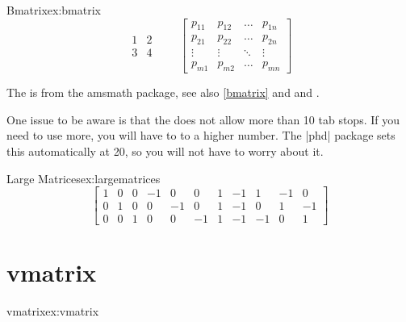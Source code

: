 {{{\begin{texexample}{Bmatrix}{ex:bmatrix}
\begin{equation}
\begin{matrix}
1 & 2 \\
3 & 4
\end{matrix} \qquad
\begin{bmatrix}
p_{11} & p_{12} & \ldots & p_{1n} \\
p_{21} & p_{22} & \ldots & p_{2n} \\
\vdots & \vdots & \ddots & \vdots \\
p_{m1} & p_{m2} & \ldots & p_{mn}
\end{bmatrix}
\end{equation}
\end{texexample}

The  is from the amsmath package, see also \vref{bmatrix} and  and \pageref{bmatrix}. 


One issue to be aware is that the  does not allow more than 10 tab stops. If you need to use more, you will have to  to a higher number. The |phd| package sets this automatically at 20, so you will not have to worry about it.

\begin{teX}
\setcounter{MaxMatrixCols}{20}
\end{teX}

\begin{texexample}{Large Matrices}{ex:largematrices}
\[
\begin{bmatrix}
1 & 0 & 0 & -1 & 0  & 0  & 1 & -1 & 1  & -1 & 0 \\
0 & 1 & 0 & 0  & -1 & 0  & 1 & -1 & 0  & 1  & -1 \\
0 & 0 & 1 & 0  & 0  & -1 & 1 & -1 & -1 & 0  & 1 
\end{bmatrix}
\]
\end{texexample}



\section{vmatrix}

\begin{texexample}{vmatrix}{ex:vmatrix}


\end{texexample}}}}

